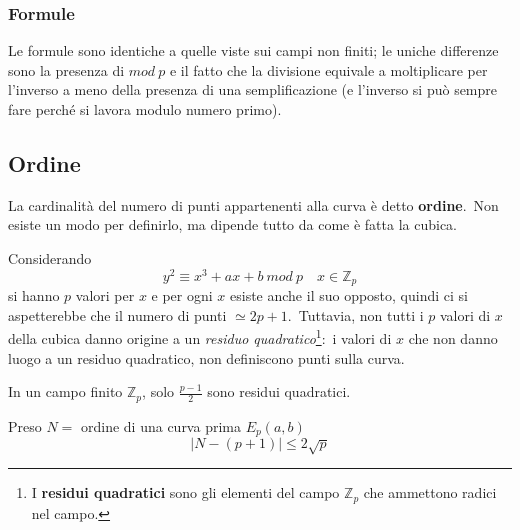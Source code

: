 \subsubsection{Formule}

Le formule sono identiche a quelle viste sui campi non finiti; le uniche differenze sono la presenza di $\mathit{mod}\ p$ e il fatto che la divisione equivale a moltiplicare per l'inverso a meno della presenza di una semplificazione (e l'inverso si può sempre fare perché si lavora modulo numero primo).\

\subsection{Ordine}

La cardinalità del numero di punti appartenenti alla curva è detto \textbf{ordine}.\
Non esiste un modo per definirlo, ma dipende tutto da come è fatta la cubica.\

Considerando \[y^2 \equiv x^3 + ax + b\ \mathit{mod}\ p\quad x\in\mathbb{Z}_p\]
si hanno $p$ valori per $x$ e per ogni $x$ esiste anche il suo opposto, quindi ci si aspetterebbe che il numero di punti $\simeq 2p + 1$.\
Tuttavia, non tutti i $p$ valori di $x$ della cubica danno origine a un \textit{residuo quadratico}\footnote{I \textbf{residui quadratici} sono gli elementi del campo $\mathbb{Z}_p$ che ammettono radici nel campo.}:\ i valori di $x$ che non danno luogo a un residuo quadratico, non definiscono punti sulla curva.\

\begin{center}
    In un campo finito $\mathbb{Z}_p$, solo $\frac{p-1}{2}$ sono residui quadratici.\
\end{center}

\begin{theorem}[Hasse]
    Preso $N =$ ordine di una curva prima $E_p(a,b)$
    \[ | N- (p+1) | \leq 2\sqrt p\]
\end{theorem}


